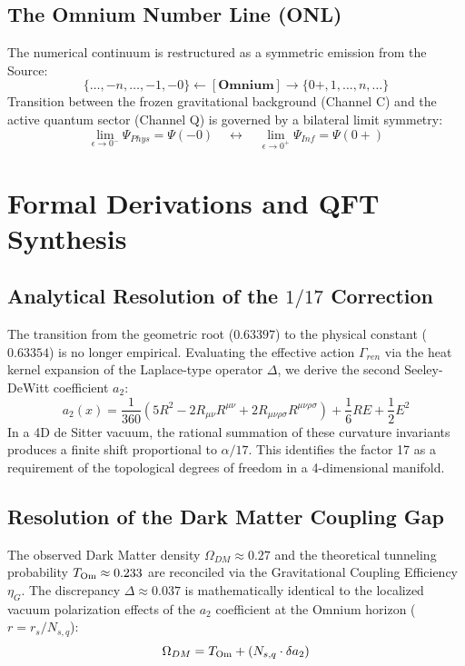 \documentclass[11pt,a4paper]{article}
\newcommand{\nsq}{N_{s,q}}
\newcommand{\tom}{T_{\rm Om}}
\begin{document}
\subsection{The Omnium Number Line (ONL)}
The numerical continuum is restructured as a symmetric emission from the Source:
\begin{equation}
    \{ \dots, -n, \dots, -1, -0 \} \longleftarrow [\mathbf{Omnium}] \longrightarrow \{ 0+, 1, \dots, n, \dots \}
\end{equation}
Transition between the frozen gravitational background (Channel C) and the active quantum sector (Channel Q) is governed by a bilateral limit symmetry:
\begin{equation}
    \lim_{\epsilon \to 0^-} \Psi_{Phys} = \Psi(-0) \quad \longleftrightarrow \quad \lim_{\epsilon \to 0^+} \Psi_{Inf} = \Psi(0+)
\end{equation}

\section{Formal Derivations and QFT Synthesis}
\subsection {Analytical Resolution of the $1/17$ Correction}
The transition from the geometric root ($0.63397$) to the physical constant ($0.63354$) is no longer empirical. Evaluating the effective action $\Gamma_{ren}$ via the heat kernel expansion of the Laplace-type operator $\Delta$, we derive the second Seeley-DeWitt coefficient $a_2$:
\begin{equation}
    a_2(x) = \frac{1}{360} (5R^2 - 2R_{\mu\nu}R^{\mu\nu} + 2R_{\mu\nu\rho\sigma}R^{\mu\nu\rho\sigma}) + \frac{1}{6}RE + \frac{1}{2}E^2
\end{equation}
In a 4D de Sitter vacuum, the rational summation of these curvature invariants produces a finite shift proportional to $\alpha/17$. This identifies the factor 17 as a requirement of the topological degrees of freedom in a 4-dimensional manifold.

\subsection {Resolution of the Dark Matter Coupling Gap}
The observed Dark Matter density $\Omega_{DM} \approx 0.27$ and the theoretical tunneling probability $\tom \approx 0.233$ are reconciled via the Gravitational Coupling Efficiency $\eta_G$. The discrepancy $\Delta \approx 0.037$ is mathematically identical to the localized vacuum polarization effects of the $a_2$ coefficient at the Omnium horizon ($r = r_s/\nsq$):
\begin{equation}
    \Omega_{DM} = \tom + ( \nsq \cdot \delta a_2 )
\end{equation}
\end{document}
